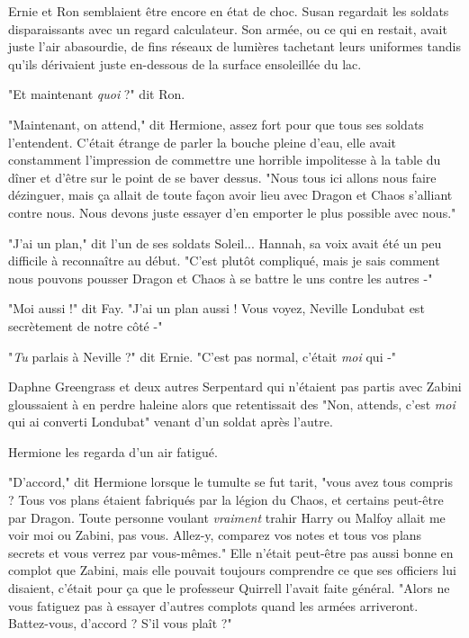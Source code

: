 Ernie et Ron semblaient être encore en état de choc. Susan regardait les soldats disparaissants avec un regard calculateur. Son armée, ou ce qui en restait, avait juste l'air abasourdie, de fins réseaux de lumières tachetant leurs uniformes tandis qu'ils dérivaient juste en-dessous de la surface ensoleillée du lac.

"Et maintenant \emph{quoi}  ?" dit Ron.

"Maintenant, on attend," dit Hermione, assez fort pour que tous ses soldats l'entendent. C'était étrange de parler la bouche pleine d'eau, elle avait constamment l'impression de commettre une horrible impolitesse à la table du dîner et d'être sur le point de se baver dessus. "Nous tous ici allons nous faire dézinguer, mais ça allait de toute façon avoir lieu avec Dragon et Chaos s'alliant contre nous. Nous devons juste essayer d'en emporter le plus possible avec nous."

"J'ai un plan," dit l'un de ses soldats Soleil... Hannah, sa voix avait été un peu difficile à reconnaître au début. "C'est plutôt compliqué, mais je sais comment nous pouvons pousser Dragon et Chaos à se battre le uns contre les autres -"

"Moi aussi !" dit Fay. "J'ai un plan aussi ! Vous voyez, Neville Londubat est secrètement de notre côté -"

"\emph{Tu}  parlais à Neville ?" dit Ernie. "C'est pas normal, c'était \emph{moi}  qui -"

Daphne Greengrass et deux autres Serpentard qui n'étaient pas partis avec Zabini gloussaient à en perdre haleine alors que retentissait des "Non, attends, c'est \emph{moi}  qui ai converti Londubat" venant d'un soldat après l'autre.

Hermione les regarda d'un air fatigué.

"D'accord," dit Hermione lorsque le tumulte se fut tarit, "vous avez tous compris ? Tous vos plans étaient fabriqués par la légion du Chaos, et certains peut-être par Dragon. Toute personne voulant \emph{vraiment}  trahir Harry ou Malfoy allait me voir moi ou Zabini, pas vous. Allez-y, comparez vos notes et tous vos plans secrets et vous verrez par vous-mêmes." Elle n'était peut-être pas aussi bonne en complot que Zabini, mais elle pouvait toujours comprendre ce que ses officiers lui disaient, c'était pour ça que le professeur Quirrell l'avait faite général. "Alors ne vous fatiguez pas à essayer d'autres complots quand les armées arriveront. Battez-vous, d'accord ? S'il vous plaît ?"

